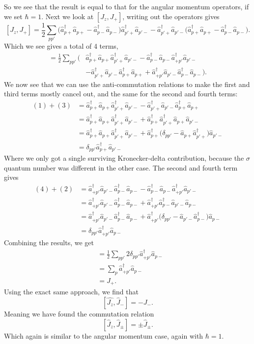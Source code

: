 \documentclass[a4paper, 11pt, notitlepage, english]{article}
\newcommand{\op}[1]{\hat{#1}}
\begin{document}
So we see that the result is equal to that for the angular momentum operators, if we set $\hbar=1$.
Next we look at $[J_z, J_+]$, writing out the operators gives
$$[J_z, J_+] = \frac{1}{2}\sum_{p p'} \big(\op{a}_{p+}^\dagger \op{a}_{p+} - \op{a}_{p-}^\dagger\op{a}_{p-}\big)\op{a}_{p'+}^\dagger \op{a}_{p'-}  - \op{a}_{p'+}^\dagger \op{a}_{p'-}\big(\op{a}_{p+}^\dagger \op{a}_{p+} - \op{a}_{p-}^\dagger\op{a}_{p-}\big).$$
Which we see gives a total of 4 terms,
\begin{align*}
[J_z, J_+] = \frac{1}{2}\sum_{p p'} \bigg(
&\op{a}_{p+}^\dagger \op{a}_{p+}\op{a}_{p'+}^\dagger \op{a}_{p'-} 
- \op{a}_{p-}^\dagger \op{a}_{p-}\op{a}_{+p'}^\dagger\op{a}_{p'-} \\
&- \op{a}_{p'+}^\dagger \op{a}_{p'-}\op{a}_{p+}^\dagger \op{a}_{p+} 
+ \op{a}_{+p'}^\dagger\op{a}_{p'-}\op{a}_{p-}^\dagger \op{a}_{p-}\bigg).
\end{align*}
We now see that we can use the anti-commutation relations to make the first and third terms mostly cancel out, and the same for the second and fourth terms:
\begin{align*}
(1) + (3) &=
\op{a}_{p+}^\dagger \op{a}_{p+}\op{a}_{p'+}^\dagger \op{a}_{p'-} 
- \op{a}_{p'+}^\dagger \op{a}_{p'-}\op{a}_{p+}^\dagger \op{a}_{p+}  \\
&= 
\op{a}_{p+}^\dagger \op{a}_{p+}\op{a}_{p'+}^\dagger \op{a}_{p'-} 
+ \op{a}_{p+}^\dagger \op{a}_{p'+}^\dagger\op{a}_{p+}\op{a}_{p'-}  \\
&=
\op{a}_{p+}^\dagger \op{a}_{p+}\op{a}_{p'+}^\dagger \op{a}_{p'-} 
+ \op{a}_{p+}^\dagger \big(\delta_{pp'}  - \op{a}_{p+}\op{a}_{p'+}^\dagger\big)\op{a}_{p'-}  \\
&= \delta_{pp'} \op{a}_{p+}^\dagger \op{a}_{p'-} 
\end{align*}
Where we only got a single surviving Kronecker-delta contribution, because the $\sigma$ quantum number was different in the other case. The second and fourth term gives
\begin{align*}
(4) + (2) &=
\op{a}_{+p'}^\dagger\op{a}_{p'-}\op{a}_{p-}^\dagger \op{a}_{p-} - \op{a}_{p-}^\dagger \op{a}_{p-}\op{a}_{+p'}^\dagger\op{a}_{p'-} \\
&=  \op{a}_{+p'}^\dagger\op{a}_{p'-}\op{a}_{p-}^\dagger \op{a}_{p-} + \op{a}_{+p'}^\dagger\op{a}_{p-}^\dagger \op{a}_{p'-} \op{a}_{p-} \\
&=  \op{a}_{+p'}^\dagger\op{a}_{p'-}\op{a}_{p-}^\dagger \op{a}_{p-} + \op{a}_{+p'}^\dagger\big( \delta_{pp'} -  \op{a}_{p'-}\op{a}_{p-}^\dagger\big) \op{a}_{p-} \\
&= \delta_{pp'}\op{a}_{+p'}^\dagger \op{a}_{p-}
\end{align*}
Combining the results, we get
\begin{align*}
[J_z, J_+] &= \frac{1}{2}\sum_{pp'} 2 \delta_{pp'}\op{a}_{+p'}^\dagger \op{a}_{p-} \\
&= \sum_{p} \op{a}_{+p'}^\dagger \op{a}_{p-} \\
&= {J}_+.
\end{align*}
Using the exact same approach, we find that
$$[\op{J_z},\op{J}_-] = -J_-.$$
Meaning we have found the commutation relation
$$[\op{J}_z,\op{J}_\pm] = \pm \op{J}_\pm.$$
Which again is similar to the angular momentum case, again with $\hbar=1$.
\end{document}
